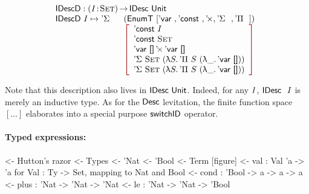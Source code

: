 \[\stk{
\IDescD : \PI{\V{I}}{\Set} \IDesc{\Unit} \\
\begin{array}{@{}ll}
\IDescD~I \mapsto \DSigma{}{} & (\EnumT \red{[} \DVar{},
                                          \DConst{},
                                          \DProd{}{},
                                          \DSigma{}{}, 
                                          \DPi{}{} \red{]}) \\
                              & \bigRedBracket{\begin{array}{l}
                                      \DConst{I}                  \\
                                      \DConst{\Set}               \\
                                      \DProd{\DVar{\Void}}{\DVar{\Void}}  \\
                                      \DSigma{\Set}{(\LAM{S} \DPi{S}{(\LAM{\_} \DVar{\Void})})} \\
                                      \DSigma{\Set}{(\LAM{S} \DPi{S}{(\LAM{\_} \DVar{\Void})})}
                                   \end{array}
                             }
\end{array}
}\]

Note that this description also lives in $\IDesc{\Unit}$. Indeed,
for any $\V{I}$, $\IDesc~\V{I}$ is merely an inductive type. As for the
$\Desc$ levitation, the finite function space $[ \ldots ]$ elaborates into a
special purpose $\F{switchID}$ operator. 

\paragraph{Typed expressions:}

\begin{wstructure}
<- Hutton's razor
    <- Types
        <- 'Nat
        <- 'Bool
    <- Term [figure]
        <- val : Val 'a -> 'a  for Val : Ty -> Set, mapping to Nat and Bool
        <- cond : 'Bool -> a -> a -> a
        <- plus : 'Nat -> 'Nat -> 'Nat
        <- le : 'Nat -> 'Nat -> 'Bool
\end{wstructure}

\newcommand{\Ty}{\C{Ty}}
\newcommand{\Ebool}{\etag{\CN{bool}}}
\newcommand{\Enat}{\etag{\CN{nat}}}

\newcommand{\Eval}[1]{\etag{\CN{val}}~#1}
\newcommand{\Econd}[3]{\etag{\CN{cond}}~#1~#2~#3}
\newcommand{\Eplus}[2]{\etag{\CN{plus}}~#1~#2}
\newcommand{\Ele}[2]{\etag{\CN{le}}~#1~#2}

